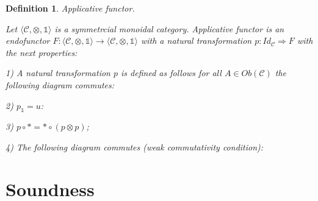 \documentclass[a4paper]{article}
\newtheorem{defin}{Definition}
\begin{document}
\begin{defin} Applicative functor.

Let $\langle \mathcal{C}, \otimes, \mathds{1} \rangle$ is a symmetrcial monoidal category. Applicative
functor is an endofunctor $F : \langle \mathcal{C}, \otimes, \mathds{1}\rangle \to \langle \mathcal{C},
\otimes, \mathds{1}\rangle$ with a natural transformation $p: Id_{\mathcal{C}} \Rightarrow F$ with the next
properties:

1) A natural transformation $p$ is defined as follows for all $A \in Ob(\mathcal{C})$ the following
diagram commutes:


2) $p_{\mathds{1}} = u$:


3) $p \circ \ast = \ast \circ (p \otimes p)$;

4) The following diagram commutes (weak commutativity condition):
\vspace{\baselineskip}
\begin{center}
\end{center}
\end{defin}

\section{Soundness}
\end{document}
